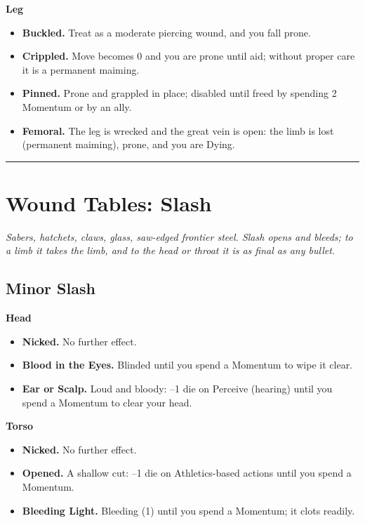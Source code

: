 \textbf{Leg}
\begin{itemize}
    \item[1] \textbf{Buckled.} Treat as a moderate piercing wound, and you fall prone.
    \item[2] \textbf{Crippled.} Move becomes 0 and you are prone until aid; without proper care it is a permanent maiming.
    \item[3] \textbf{Pinned.} Prone and grappled in place; disabled until freed by spending 2 Momentum or by an ally.
    \item[4] \textbf{Femoral.} The leg is wrecked and the great vein is open: the limb is lost (permanent maiming), prone, and you are Dying.
\end{itemize}

\medskip\hrule\medskip

\section{Wound Tables: Slash}

\textit{Sabers, hatchets, claws, glass, saw-edged frontier steel. Slash opens and bleeds; to a limb it takes the limb, and to the head or throat it is as final as any bullet.}

\subsection{Minor Slash}

\textbf{Head}
\begin{itemize}
    \item[1--2] \textbf{Nicked.} No further effect.
    \item[3] \textbf{Blood in the Eyes.} Blinded until you spend a Momentum to wipe it clear.
    \item[4] \textbf{Ear or Scalp.} Loud and bloody: --1 die on Perceive (hearing) until you spend a Momentum to clear your head.
\end{itemize}

\textbf{Torso}
\begin{itemize}
    \item[1--2] \textbf{Nicked.} No further effect.
    \item[3] \textbf{Opened.} A shallow cut: --1 die on Athletics-based actions until you spend a Momentum.
    \item[4] \textbf{Bleeding Light.} Bleeding (1) until you spend a Momentum; it clots readily.
\end{itemize}


